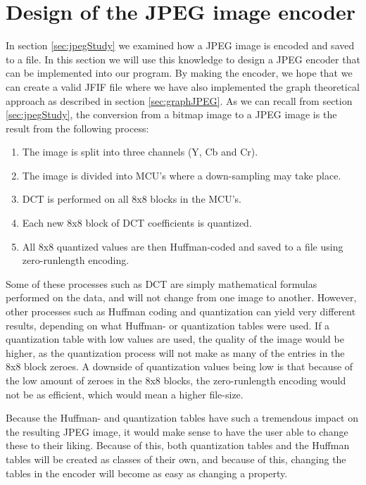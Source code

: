 \section{Design of the JPEG image encoder}
\label{sec:designJPEG}
In section \ref{sec:jpegStudy} we examined how a JPEG image is encoded and saved to a file.
In this section we will use this knowledge to design a JPEG encoder that can be implemented into our program.
By making the encoder, we hope that we can create a valid JFIF file where we have also implemented the graph theoretical approach as described in section \ref{sec:graphJPEG}.
As we can recall from section \ref{sec:jpegStudy}, the conversion from a bitmap image to a JPEG image is the result from the following process:

\begin{enumerate}
	\item The image is split into three channels (Y, Cb and Cr).
	\item The image is divided into MCU's where a down-sampling may take place.
	\item DCT is performed on all 8x8 blocks in the MCU's.
	\item Each new 8x8 block of DCT coefficients is quantized.
	\item All 8x8 quantized values are then Huffman-coded and saved to a file using zero-runlength encoding.
\end{enumerate}

Some of these processes such as DCT are simply mathematical formulas performed on the data, and will not change from one image to another.
However, other processes such as Huffman coding and quantization can yield very different results, depending on what Huffman- or quantization tables were used.
If a quantization table with low values are used, the quality of the image would be higher, as the quantization process will not make as many of the entries in the 8x8 block zeroes.
A downside of quantization values being low is that because of the low amount of zeroes in the 8x8 blocks, the zero-runlength encoding would not be as efficient, which would mean a higher file-size.

Because the Huffman- and quantization tables have such a tremendous impact on the resulting JPEG image, it would make sense to have the user able to change these to their liking.
Because of this, both quantization tables and the Huffman tables will be created as classes of their own, and because of this, changing the tables in the encoder will become as easy as changing a property.

